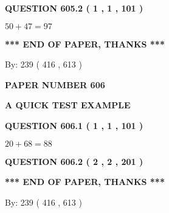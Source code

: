 \documentclass[12pt]{article}
\begin{document}
{\textbf{\Large{QUESTION
605.2 
 ( 1 , 1 , 101 )
}}}
  
  
 
 

$ %
50 +  %
47=   %
97$
 
 
   
   
 \vspace{0.2in}
 
   
   
   
   
\vspace{1.0in} 
{\textbf{\large{ *** END OF PAPER, THANKS *** }}} 
   
   
\hspace{1.0in} By: 
 239 ( 416 ,  613 )
   
   
   
   
\newpage 
\setcounter{page}{ 
   606001 } 
   
   
   
   
 {\textbf{ \Large{ PAPER NUMBER  606  }}}
   
   
\vspace{0.2in}
   
   
   
   
   
   
 \vspace{0.2in}
{\LARGE {\textbf{ A QUICK TEST EXAMPLE}}}
   
   
  
\vspace{0.2in}
  
{\textbf{\Large{QUESTION
606.1 
 ( 1 , 1 , 101 )
}}}
  
  
 
 

$ %
20 +  %
68=   %
88$
 
 
  
\vspace{0.2in}
  
{\textbf{\Large{QUESTION
606.2 
 ( 2 , 2 , 201 )
}}}
  
  
   
   
 \vspace{0.2in}
 
   
   
   
   
\vspace{1.0in} 
{\textbf{\large{ *** END OF PAPER, THANKS *** }}} 
   
   
\hspace{1.0in} By: 
 239 ( 416 ,  613 )
   
\end{document}
